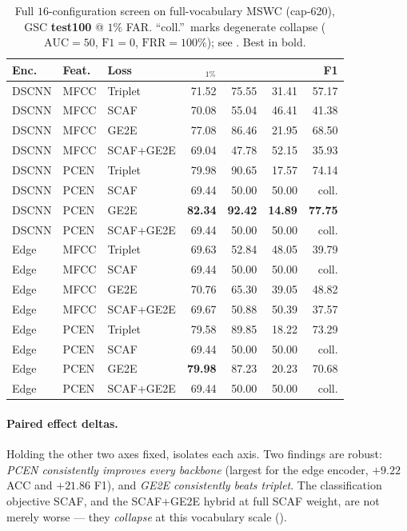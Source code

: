 \documentclass[10pt,twocolumn]{article}
\newcommand{\best}[1]{\textbf{#1}}
\newcommand{\acc}{\text{ACC}}
\newcommand{\frr}{\text{FRR}}
\newcommand{\eer}{\text{EER}}
\newcommand{\auc}{\text{AUC}}
\begin{document}
\begin{table}[t]
\centering
\caption{Full $16$-configuration screen on full-vocabulary MSWC (cap-620),
GSC \textbf{test100} @ $1\%$ FAR. ``coll.''\ marks degenerate collapse
($\auc{=}50$, $\text{F1}{=}0$, $\frr{=}100\%$); see . Best in
bold.}
\label{tab:matrix}
\footnotesize
\setlength{\tabcolsep}{3.2pt}
\begin{tabular}{lll r r r r}
\toprule
\textbf{Enc.} & \textbf{Feat.} & \textbf{Loss} &
\acc$_{1\%}$ & \auc & \eer & F1\\
\midrule
DSCNN & MFCC & Triplet     & 71.52 & 75.55 & 31.41 & 57.17 \\
DSCNN & MFCC & SCAF        & 70.08 & 55.04 & 46.41 & 41.38 \\
DSCNN & MFCC & GE2E        & 77.08 & 86.46 & 21.95 & 68.50 \\
DSCNN & MFCC & SCAF+GE2E   & 69.04 & 47.78 & 52.15 & 35.93 \\
DSCNN & PCEN & Triplet     & 79.98 & 90.65 & 17.57 & 74.14 \\
DSCNN & PCEN & SCAF        & 69.44 & 50.00 & 50.00 & {coll.} \\
\rowcolor{blue!7}
DSCNN & PCEN & GE2E        & \best{82.34} & \best{92.42} & \best{14.89} & \best{77.75} \\
DSCNN & PCEN & SCAF+GE2E   & 69.44 & 50.00 & 50.00 & {coll.} \\
Edge  & MFCC & Triplet     & 69.63 & 52.84 & 48.05 & 39.79 \\
Edge  & MFCC & SCAF        & 69.44 & 50.00 & 50.00 & {coll.} \\
Edge  & MFCC & GE2E        & 70.76 & 65.30 & 39.05 & 48.82 \\
Edge  & MFCC & SCAF+GE2E   & 69.67 & 50.88 & 50.39 & 37.57 \\
Edge  & PCEN & Triplet     & 79.58 & 89.85 & 18.22 & 73.29 \\
Edge  & PCEN & SCAF        & 69.44 & 50.00 & 50.00 & {coll.} \\
\rowcolor{blue!7}
Edge  & PCEN & GE2E        & \best{79.98} & 87.23 & 20.23 & 70.68 \\
Edge  & PCEN & SCAF+GE2E   & 69.44 & 50.00 & 50.00 & {coll.} \\
\bottomrule
\end{tabular}
\end{table}

\paragraph{Paired effect deltas.}
Holding the other two axes fixed,  isolates each axis. Two
findings are robust: \emph{PCEN consistently improves every backbone} (largest
for the edge encoder, $+9.22$ ACC and $+21.86$ F1), and \emph{GE2E consistently
beats triplet}. The classification objective SCAF, and the SCAF$+$GE2E hybrid at
full SCAF weight, are not merely worse --- they \emph{collapse} at this
vocabulary scale ().
\end{document}
